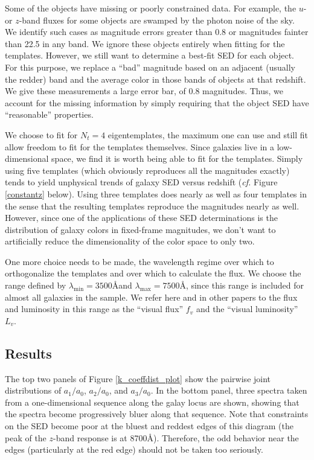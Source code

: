 \documentclass[10pt,preprint]{aastex}
\begin{document}
Some of the objects have missing or poorly constrained data. For
example, the $u$- or $z$-band fluxes for some objects are swamped by
the photon noise of the sky. We identify such cases as magnitude
errors greater than 0.8 or magnitudes fainter than 22.5 in any
band. We ignore these objects entirely when fitting for the
templates. However, we still want to determine a best-fit SED for each
object. For this purpose, we replace a ``bad'' magnitude based on an
adjacent (usually the redder) band and the average color in those
bands of objects at that redshift. We give these measurements a large
error bar, of 0.8 magnitudes. Thus, we account for the missing
information by simply requiring that the object SED have
``reasonable'' properties.

We choose to fit for $N_t = 4$ eigentemplates, the maximum one can use
and still fit allow freedom to fit for the templates themselves. Since
galaxies live in a low-dimensional space, we find it is worth being
able to fit for the templates. Simply using five templates (which
obviously reproduces all the magnitudes exactly) tends to yield
unphysical trends of galaxy SED versus redshift ({\it cf.}  Figure
\ref{constantz} below). Using three templates does nearly as well as
four templates in the sense that the resulting templates reproduce the
magnitudes nearly as well. However, since one of the applications of
these SED determinations is the distribution of galaxy colors in
fixed-frame magnitudes, we don't want to artificially reduce the
dimensionality of the color space to only two.

One more choice needs to be made, the wavelength regime over which to
orthogonalize the templates and over which to calculate the flux. We
choose the range defined by $\lambda_{\mathrm{min}}=3500$\AA and
$\lambda_{\mathrm{max}}=7500$\AA, since this range is included for
almost all galaxies in the sample. We refer here and in other papers
to the flux and luminosity in this range as the ``visual flux'' $f_v$
and the ``visual luminosity'' $L_v$.

\subsection{Results}

The top two panels of Figure \ref{k_coeffdist_plot} show the pairwise
joint distributions of $a_1/a_0$, $a_2/a_0$, and $a_3/a_0$. In the
bottom panel, three spectra taken from a one-dimensional sequence
along the galay locus are shown, showing that the spectra become
progressively bluer along that sequence. Note that constraints on the
SED become poor at the bluest and reddest edges of this diagram (the
peak of the $z$-band response is at 8700\AA). Therefore, the odd
behavior near the edges (particularly at the red edge) should not be
taken too seriously.
\end{document}
